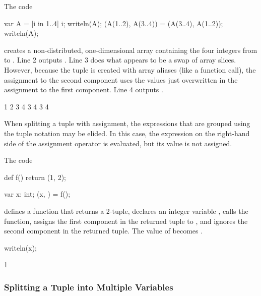 \begin{example}
\begin{chapelpre}
\end{chapelpre}
The code
\begin{chapel}
var A = [i in 1..4] i;
writeln(A);
(A(1..2), A(3..4)) = (A(3..4), A(1..2));
writeln(A);
\end{chapel}
creates a non-distributed, one-dimensional array containing the four
integers from  to .  Line 2 outputs .
Line 3 does what appears to be a swap of array slices.  However,
because the tuple is created with array aliases (like a function
call), the assignment to the second component uses the values just
overwritten in the assignment to the first component.  Line 4
outputs .
\begin{chapelpost}
\end{chapelpost}
\begin{chapeloutput}
1 2 3 4
3 4 3 4
\end{chapeloutput}
\end{example}

When splitting a tuple with assignment, the expressions that are
grouped using the tuple notation may be elided.  In this case, the
expression on the right-hand side of the assignment operator is
evaluated, but its value is not assigned.

\begin{example}
\begin{chapelpre}
\end{chapelpre}
The code
\begin{chapel}
def f()
  return (1, 2);

var x: int;
(x, ) = f();
\end{chapel}
defines a function that returns a 2-tuple, declares an integer
variable , calls the function, assigns the first component in
the returned tuple to , and ignores the second component in
the returned tuple.  The value of  becomes .
\begin{chapelpost}
writeln(x);
\end{chapelpost}
\begin{chapeloutput}
1
\end{chapeloutput}
\end{example}

\subsubsection{Splitting a Tuple into Multiple Variables}
\label{Variable_Declarations_in_a_Tuple}

